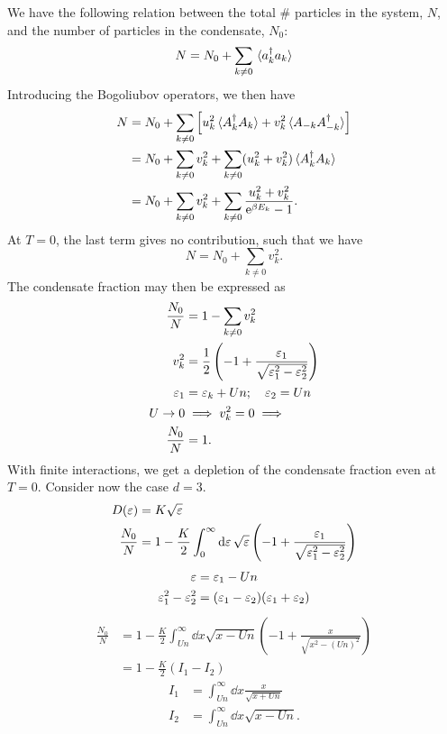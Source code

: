 We have the following relation between the total $\#$ particles in the system, $N$, and the number of particles in the condensate, $N_0$:
\begin{equation}
	N = N_0  + \sum_{k\ne0}\ev*{a_{k}^{\dg}a_{k}}
\end{equation}
Introducing the Bogoliubov operators, we then have
\begin{align}
	N &= N_0 + \sum_{k\ne0}\left [u_k^2\ev*{A_{k}^{\dg}A_{k}} + v_k^2\ev*{A_{-k}A_{-k}^{\dg}}\right ] \nonumber\\
	&= N_0 + \sum_{k\ne0}v_k^2 + \sum_{k\ne0}(u_k^2 + v_k^2)\ev*{A_{k}^{\dg}A_k}\nonumber \\
	&= N_0 + \sum_{k\ne0}v_k^2 + \sum_{k\ne0}\frac{u_k^2 + v_k^2}{\e^{\beta E_k}-1}.
\end{align}
At $T = 0$, the last term gives no contribution, such that we have
\begin{equation}
	N = N_0 + \sum_{k\ne0}v_k^2.
\end{equation}
The condensate fraction may then be expressed as 
\begin{align}
	\frac{N_0}{N} &= 1-\sum_{k\ne0}v_k^2 \\
	v_k^2 &= \frac{1}{2}\left (-1 + \frac{\varepsilon_1}{\sqrt{\varepsilon_1^2-\varepsilon_2^2}}\right )\\
	\varepsilon_1 &= \varepsilon_k + Un;\quad \varepsilon_2 = Un \nonumber\\
	U\rightarrow 0 &\implies v_k^2 = 0 \implies\nonumber \\
	\frac{N_0}{N} &= 1.
\end{align}
With finite interactions, we get a depletion of the condensate fraction even at $T = 0$. 
Consider now the case $d = 3$.
\begin{align}
	D(\varepsilon) &= K\sqrt{\varepsilon} \\
	\frac{N_0}{N} &= 1- \frac{K}{2}\int_0^{\infty}\dd{\varepsilon}\sqrt{\varepsilon}\left (-1 + \frac{\varepsilon_1}{\sqrt{\varepsilon_1^2-\varepsilon_2^2}}\right ) 
\end{align}
\begin{align}
	\varepsilon &= \varepsilon_1 - Un \nonumber\\
	\varepsilon_1^2-\varepsilon_2^2 &= (\varepsilon_1-\varepsilon_2)(\varepsilon_1 + \varepsilon_2) 
\end{align}
\begin{align}
	\frac{N_0}{N} &= 1- \frac{K}{2}\int_{Un}^{\infty}\dd{x}\sqrt{x-Un}\left (-1 + \frac{x}{\sqrt{x^2-(Un)^2}}\right ) \\
	&= 1-\frac{K}{2}(I_1 - I_2) 
\end{align}
\begin{align}
	I_1 &= \int_{Un}^{\infty}\dd{x}\frac{x}{\sqrt{x + Un}} \\
	I_2 &= \int_{Un}^{\infty}\dd{x} \sqrt{x-Un}.
\end{align}
